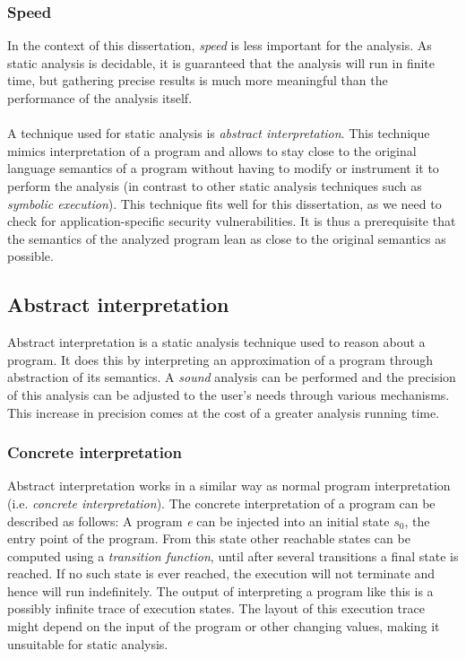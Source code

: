 \subsubsection*{Speed}

In the context of this dissertation, \textit{speed} is less important for the analysis. As static analysis is decidable, it is guaranteed that the analysis will run in finite time, but gathering precise results is much more meaningful than the performance of the analysis itself.
\\\\
\noindent A technique used for static analysis is \textit{abstract interpretation}. This technique mimics interpretation of a program and allows to stay close to the original language semantics of a program without having to modify or instrument it to perform the analysis (in contrast to other static analysis techniques such as \textit{symbolic execution}). This technique fits well for this dissertation, as we need to check for application-specific security vulnerabilities. It is thus a prerequisite that the semantics of the analyzed program lean as close to the original semantics as possible.

\subsection{Abstract interpretation}
Abstract interpretation is a static analysis technique used to reason about a program. It does this by interpreting an approximation of a program through abstraction of its semantics. A \textit{sound} analysis can be performed and the precision of this analysis can be adjusted to the user's needs through various mechanisms. This increase in precision comes at the cost of a greater analysis running time. 

\subsubsection*{Concrete interpretation}

Abstract interpretation works in a similar way as normal program interpretation (i.e. \textit{concrete interpretation}). The concrete interpretation of a program can be described as follows: A program \textit{e} can be injected into an initial state \textit{$s_0$}, the entry point of the program. From this state other reachable states can be computed using a \textit{transition function}, until after several transitions a final state is reached. If no such state is ever reached, the execution will not terminate and hence will run indefinitely. The output of interpreting a program like this is a possibly infinite trace of execution states. The layout of this execution trace might depend on the input of the program or other changing values, making it unsuitable for static analysis. 

